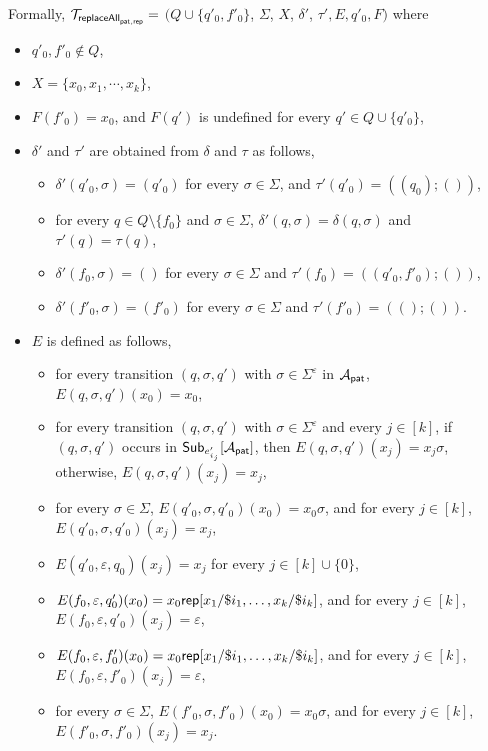 Formally, $\mathcal{T}_{\mathsf{replaceAll}_{\mathsf{pat}, \mathsf{rep}}} =$ $(Q \cup \{q'_0, f'_0\}$, $\Sigma$, $X$, $\delta'$, $\tau', E, q'_0, F)$ where
\begin{itemize}
\item $q'_0, f'_0 \not \in Q$,

\item  $X = \{x_0, x_1, \cdots, x_k\}$,
%
\item $F(f'_0) = x_0$, and $F(q')$ is undefined for every $q' \in Q \cup \{q'_0\}$,
%
\item $\delta'$ and $\tau'$ are obtained from $\delta$ and $\tau$ as follows,
\begin{itemize}
\item $\delta'(q'_0, \sigma) = (q'_0)$ for every $\sigma \in \Sigma$, and $\tau'(q'_0) = ((q_0); ())$,
%
\item  for every $q \in Q \setminus \{f_0\}$ and $\sigma \in \Sigma$, $\delta'(q, \sigma) = \delta(q, \sigma)$ and $\tau'(q) = \tau(q)$, 
%
\item $\delta'(f_0, \sigma) = ()$ for every $\sigma \in \Sigma$ and $\tau'(f_0) = ((q'_0,f'_0); ())$,
%
\item $\delta'(f'_0, \sigma) = (f'_0)$ for every $\sigma \in \Sigma$ and $\tau'(f'_0) = ((); ())$.
\end{itemize}
%
\item $E$ is defined as follows, 
\begin{itemize}
\item for every transition $(q, \sigma, q')$ with $\sigma \in \Sigma^\varepsilon$ in $\mathcal{A}_{\mathsf{pat}}$, $E(q, \sigma, q')(x_0) = x_0$,
%
\item for every transition $(q, \sigma, q')$ with $\sigma \in \Sigma^\varepsilon$ and every $j \in [k]$,  if $(q, \sigma, q')$ occurs in ${\sf Sub}_{e'_{i_j}}[\mathcal{A}_{\mathsf{pat}}]$, then $E(q, \sigma, q')(x_j) = x_j\sigma$, otherwise, $E(q, \sigma, q')(x_j) = x_j$,
%
%
\item  for every $\sigma \in \Sigma$, $E(q'_0, \sigma, q'_0)(x_0) = x_0\sigma$, and for every $j \in [k]$, $E(q'_0, \sigma, q'_0)(x_j) = x_j$, 

\item $E(q'_0, \varepsilon, q_0)(x_j) = x_j$ for every $j \in [k] \cup \{0\}$, 
%
\item $E(f_0, \varepsilon, q'_0)(x_0) = x_0 \mathsf{rep}[x_1/\$i_1,\ldots, x_k/\$i_k]$, and for every $j \in [k]$, $E(f_0, \varepsilon, q'_0)(x_j) = \varepsilon$, 
%
\item $E(f_0, \varepsilon, f'_0)(x_0) = x_0  \mathsf{rep}[x_1/\$i_1,\ldots, x_k/\$i_k]$, and for every $j \in [k]$, $E(f_0, \varepsilon, f'_0)(x_j) = \varepsilon$,
%
\item for every $\sigma \in \Sigma$, $E(f'_0, \sigma, f'_0)(x_0) = x_0 \sigma$, and  for every $j \in [k]$, $E(f'_0, \sigma, f'_0)(x_j) = x_j$.
\end{itemize}
%
\end{itemize}

